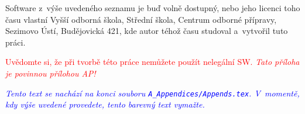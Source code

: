 Software z~výše uvedeného seznamu je buď volně dostupný, nebo jeho licenci toho času vlastní Vyšší odborná škola, Střední škola, Centrum odborné přípravy, Sezimovo Ústí, Budějovická 421, kde autor téhož času studoval a~vytvořil tuto práci. 

\textcolor{red}{Uvědomte si, že při tvorbě této práce nemůžete použít nelegální SW.} \textcolor{red}{\em Tato příloha je povinnou přílohou AP!}

\textcolor{blue}{\em Tento text se nachází na konci souboru \texttt{A\_Appendices/Appends.tex}. V~momentě, kdy výše uvedené provedete, tento barevný text vymažte.\/}
